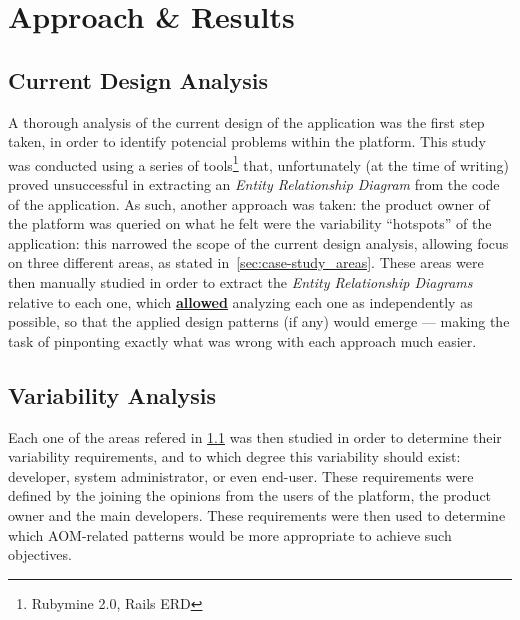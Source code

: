 \chapter{Approach \& Results}\label{chap:approach_results}



\section{Current Design Analysis}\label{sec:current_design_analysis}

A thorough analysis of the current design of the application was the first step taken, in order to identify potencial problems within the platform. This study was conducted using a series of tools\footnote{Rubymine 2.0\cite{rubymine}, Rails ERD\cite{rails_erd}} that, unfortunately (at the time of writing) proved unsuccessful in extracting an \emph{Entity Relationship Diagram} from the code of the application. As such, another approach was taken: the product owner of the platform was queried on what he felt were the variability ``hotspots'' of the application: this narrowed the scope of the current design analysis, allowing focus on three different areas, as stated in~\ref{sec:case-study_areas}. These areas were then manually studied in order to extract the \emph{Entity Relationship Diagrams} relative to each one, which \textbf{\underline{allowed}} analyzing each one as independently as possible, so that the applied design patterns (if any) would emerge --- making the task of pinponting exactly what was wrong with each approach much easier.

\section{Variability Analysis}\label{sec:variability_analysis}

Each one of the areas refered in \ref{sec:current_design_analysis} was then studied in order to determine their variability requirements, and to which degree this variability should exist: developer, system administrator, or even end-user. These requirements were defined by the joining the opinions from the users of the platform, the product owner and the main developers. These requirements were then used to determine which AOM-related patterns would be more appropriate to achieve such objectives.

